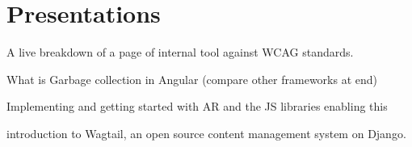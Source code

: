 \documentclass[a4paper]{deedy-resume_twopage} %
\begin{document}

\newpage %

\begin{minipage}[t]{0.66\textwidth} %


  \section{Presentations}


  A live breakdown of a page of internal tool against WCAG standards.
  \sectionspace %



  What is Garbage collection in Angular (compare other frameworks at end)
  \sectionspace %



  Implementing and getting started with AR and the JS libraries enabling this
  \sectionspace %



  introduction to Wagtail, an open source content management system on Django. %


\end{minipage}
\end{document}
